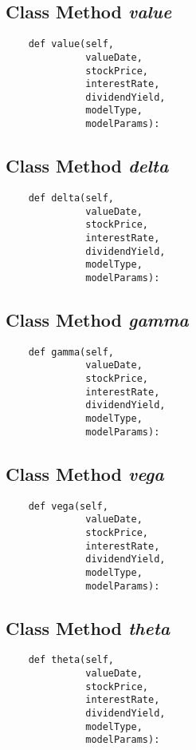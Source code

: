 \documentclass[twoside,11pt]{book}
\begin{document}
\subsection{Class Method {\it value}}


\begin{lstlisting}
    def value(self,
              valueDate,
              stockPrice,
              interestRate,
              dividendYield,
              modelType,
              modelParams):
\end{lstlisting}

\subsection{Class Method {\it delta}}


\begin{lstlisting}
    def delta(self,
              valueDate,
              stockPrice,
              interestRate,
              dividendYield,
              modelType,
              modelParams):
\end{lstlisting}

\subsection{Class Method {\it gamma}}


\begin{lstlisting}
    def gamma(self,
              valueDate,
              stockPrice,
              interestRate,
              dividendYield,
              modelType,
              modelParams):
\end{lstlisting}

\subsection{Class Method {\it vega}}


\begin{lstlisting}
    def vega(self,
              valueDate,
              stockPrice,
              interestRate,
              dividendYield,
              modelType,
              modelParams):
\end{lstlisting}

\subsection{Class Method {\it theta}}


\begin{lstlisting}
    def theta(self,
              valueDate,
              stockPrice,
              interestRate,
              dividendYield,
              modelType,
              modelParams):
\end{lstlisting}
\end{document}

